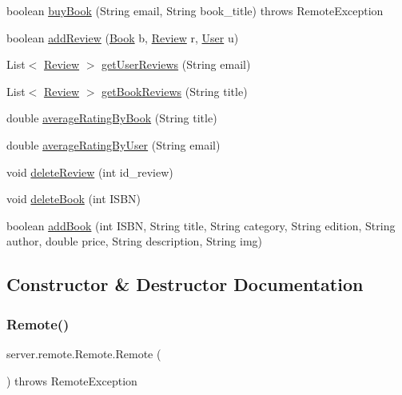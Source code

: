 \begin{DoxyCompactItemize}
\item 
boolean \hyperlink{classserver_1_1remote_1_1_remote_af5d1abb1730b8db14ab9dd476df158d8}{buy\+Book} (String email, String book\+\_\+title)  throws Remote\+Exception
\item 
boolean \hyperlink{classserver_1_1remote_1_1_remote_af94163cf6d5c40cfc880eb517d56aa48}{add\+Review} (\hyperlink{classserver_1_1data_1_1_book}{Book} b, \hyperlink{classserver_1_1data_1_1_review}{Review} r, \hyperlink{classserver_1_1data_1_1_user}{User} u)
\item 
List$<$ \hyperlink{classserver_1_1data_1_1_review}{Review} $>$ \hyperlink{classserver_1_1remote_1_1_remote_a396c96a6b8802c2b4658ecccd37e84db}{get\+User\+Reviews} (String email)
\item 
List$<$ \hyperlink{classserver_1_1data_1_1_review}{Review} $>$ \hyperlink{classserver_1_1remote_1_1_remote_a501e5c5fe847917c9615f0772864a147}{get\+Book\+Reviews} (String title)
\item 
double \hyperlink{classserver_1_1remote_1_1_remote_afd253ddc199a34a1e05317878f957cc9}{average\+Rating\+By\+Book} (String title)
\item 
double \hyperlink{classserver_1_1remote_1_1_remote_a67fc7aeeb889a80cda6e1a5f83858c2a}{average\+Rating\+By\+User} (String email)
\item 
void \hyperlink{classserver_1_1remote_1_1_remote_ab80b5addc446fe5f1ecf9a522794ff4f}{delete\+Review} (int id\+\_\+review)
\item 
void \hyperlink{classserver_1_1remote_1_1_remote_a013ab36d40de824c6ad7a48f59d12684}{delete\+Book} (int I\+S\+BN)
\item 
boolean \hyperlink{classserver_1_1remote_1_1_remote_afd807d8743560106c61a01094795c9cb}{add\+Book} (int I\+S\+BN, String title, String category, String edition, String author, double price, String description, String img)
\end{DoxyCompactItemize}


\subsection{Constructor \& Destructor Documentation}
\mbox{\label{classserver_1_1remote_1_1_remote_a023cdc695c53195005bf645a97307529}} 
\subsubsection{\texorpdfstring{Remote()}{Remote()}}
{\footnotesize\ttfamily server.\+remote.\+Remote.\+Remote (\begin{DoxyParamCaption}{ }\end{DoxyParamCaption}) throws Remote\+Exception}



